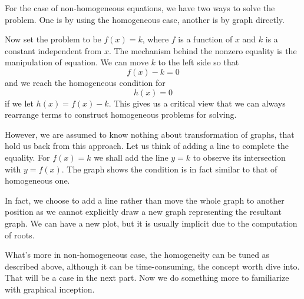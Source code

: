 \documentclass[12pt]{article}
\begin{document}
    For the case of non-homogeneous equations, we have two ways to solve the problem. One is by using the homogeneous case, another is by graph directly.

    Now set the problem to be $f(x)=k$, where $f$ is a function of $x$ and $k$ is a constant independent from $x$. The mechanism behind the nonzero equality is the manipulation of equation. We can move $k$ to the left side so that \[f(x)-k=0\] and we reach the homogeneous condition for \[h(x)=0\] if we let $h(x)=f(x)-k$. This gives us a critical view that we can always rearrange terms to construct homogeneous problems for solving.

    However, we are assumed to know nothing about transformation of graphs, that hold us back from this approach. Let us think of adding a line to complete the equality. For $f(x)=k$ we shall add the line $y=k$ to observe its intersection with $y=f(x)$. The graph shows the condition is in fact similar to that of homogeneous one.

    \begin{center}
    \end{center}

    In fact, we choose to add a line rather than move the whole graph to another position as we cannot explicitly draw a new graph representing the resultant graph. We can have a new plot, but it is usually implicit due to the computation of roots.

    What's more in non-homogeneous case, the homogeneity can be tuned as described above, although it can be time-consuming, the concept worth dive into. That will be a case in the next part. Now we do something more to familiarize with graphical inception.
\end{document}
